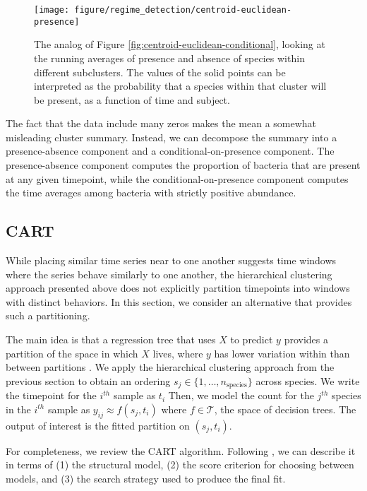 \begin{figure}
  \centering
  \texttt{[image: figure/regime\_detection/centroid-euclidean-presence]}
  \caption{The analog of Figure \ref{fig:centroid-euclidean-conditional},
    looking at the running averages of presence and absence of species within
    different subclusters. The values of the solid points can be interpreted as
    the probability that a species within that cluster will be present, as a
    function of time and subject.
    \label{fig:centroid-euclidean-presence} }
\end{figure}

The fact that the data include many zeros makes the mean a somewhat misleading
cluster summary. Instead, we can decompose the summary into a presence-absence
component and a conditional-on-presence component. The presence-absence
component computes the proportion of bacteria that are present at any given
timepoint, while the conditional-on-presence component computes the time
averages among bacteria with strictly positive abundance.

\subsection{CART}

While placing similar time series near to one another suggests time windows
where the series behave similarly to one another, the hierarchical clustering
approach presented above does not explicitly partition timepoints into windows
with distinct behaviors. In this section, we consider an alternative that
provides such a partitioning.

The main idea is that a regression tree that uses $X$ to predict $y$ provides a
partition of the space in which $X$ lives, where $y$ has lower variation within
than between partitions \citep{breiman1984classification}. We apply the
hierarchical clustering approach from the previous section to obtain an ordering
$s_{j} \in \{1, \dots, n_{\text{species}}\}$ across species. We write the
timepoint for the $i^{th}$ sample as $t_{i}$ Then, we model the count for the
$j^{th}$ species in the $i^{th}$ sample as $y_{ij} \approx f\left(s_{j},
t_{i}\right)$ where $f \in \mathcal{T}$, the space of decision trees. The output
of interest is the fitted partition on $\left(s_{j}, t_{i}\right)$.

For completeness, we review the CART algorithm. Following \citep{stat315bnotes},
we can describe it in terms of (1) the structural model, (2) the score criterion
for choosing between models, and (3) the search strategy used to produce the
final fit.

